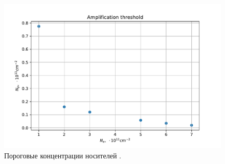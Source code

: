 \documentclass[../main.tex]{subfiles}
\begin{document}
    \begin{figure}[h]
        \begin{minipage}[h]{1\textwidth}
            \includegraphics[width=1\textwidth]{./images/threshold_6nm_42K.pdf}
            \caption{Пороговые концентрации носителей \label{plasmon:threshold_42}.}
        \end{minipage}
    \end{figure}
\end{document}
